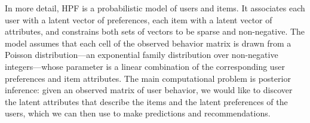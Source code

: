 


In more detail, HPF is a probabilistic model of users and items.  It
associates each user with a latent vector of preferences, each item
with a latent vector of attributes, and constrains both sets of
vectors to be sparse and non-negative. The model assumes that each
cell of the observed behavior matrix is drawn from a Poisson
distribution---an exponential family distribution over non-negative
integers---whose parameter is a linear combination of the
corresponding user preferences and item attributes.  The main
computational problem is posterior inference: given an observed matrix
of user behavior, we would like to discover the latent attributes that
describe the items and the latent preferences of the users, which we
can then use to make predictions and recommendations.

